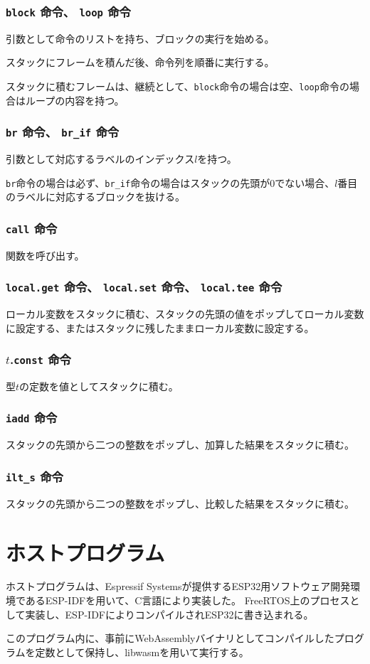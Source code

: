 \subsubsection{{\tt block} 命令、 {\tt loop} 命令}

引数として命令のリストを持ち、ブロックの実行を始める。

スタックにフレームを積んだ後、命令列を順番に実行する。

スタックに積むフレームは、継続として、\verb|block|命令の場合は空、\verb|loop|命令の場合はループの内容を持つ。

\subsubsection{{\tt br} 命令、 {\tt br\_if} 命令}

引数として対応するラベルのインデックス$l$を持つ。

\verb|br|命令の場合は必ず、\verb|br_if|命令の場合はスタックの先頭が0でない場合、$l$番目のラベルに対応するブロックを抜ける。

\subsubsection{{\tt call} 命令}

関数を呼び出す。

\subsubsection{{\tt local.get} 命令、 {\tt local.set} 命令、 {\tt local.tee} 命令}

ローカル変数をスタックに積む、スタックの先頭の値をポップしてローカル変数に設定する、またはスタックに残したままローカル変数に設定する。

\subsubsection{$t$.{\tt const} 命令}

型$t$の定数を値としてスタックに積む。

\subsubsection{{\tt iadd} 命令}

スタックの先頭から二つの整数をポップし、加算した結果をスタックに積む。

\subsubsection{{\tt ilt\_s} 命令}

スタックの先頭から二つの整数をポップし、比較した結果をスタックに積む。

\section{ホストプログラム}

ホストプログラムは、Espressif Systemsが提供するESP32用ソフトウェア開発環境であるESP-IDF\cite{esp_idf}を用いて、C言語により実装した。
FreeRTOS上のプロセスとして実装し、ESP-IDFによりコンパイルされESP32に書き込まれる。

このプログラム内に、事前にWebAssemblyバイナリとしてコンパイルしたプログラムを定数として保持し、libwasmを用いて実行する。
